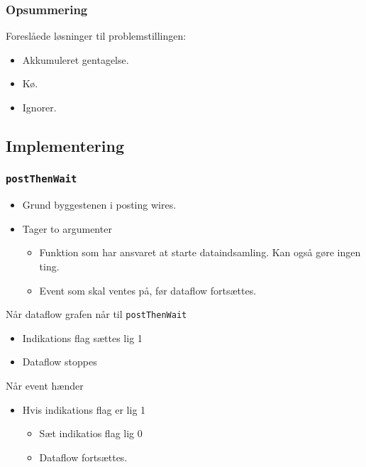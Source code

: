 \documentclass[t]{beamer}
\begin{document}
  
\begin{frame}
  \frametitle{Opsummering}

  Foreslåede løsninger til problemstillingen:

  \begin{itemize}
  \item Akkumuleret gentagelse.
  \item Kø.
  \item Ignorer.
  \end{itemize}

\end{frame}

\subsection{Implementering}

\begin{frame}
  \frametitle{\texttt{postThenWait}}

  \begin{itemize}
  \item Grund byggestenen i posting wires.
  \item Tager to argumenter
    \begin{itemize}
    \item Funktion som har ansvaret at starte dataindsamling. Kan også gøre
      ingen ting.
    \item Event som skal ventes på, før dataflow fortsættes.
    \end{itemize}
  \end{itemize}

  Når dataflow grafen når til \texttt{postThenWait}

  \begin{itemize}
  \item Indikations flag sættes lig 1
  \item Dataflow stoppes
  \end{itemize}

  Når event hænder

  \begin{itemize}
  \item Hvis indikations flag er lig 1
    \begin{itemize}
    \item Sæt indikatios flag lig 0
    \item Dataflow fortsættes.
    \end{itemize}
  \end{itemize}


\end{frame}
\end{document}
